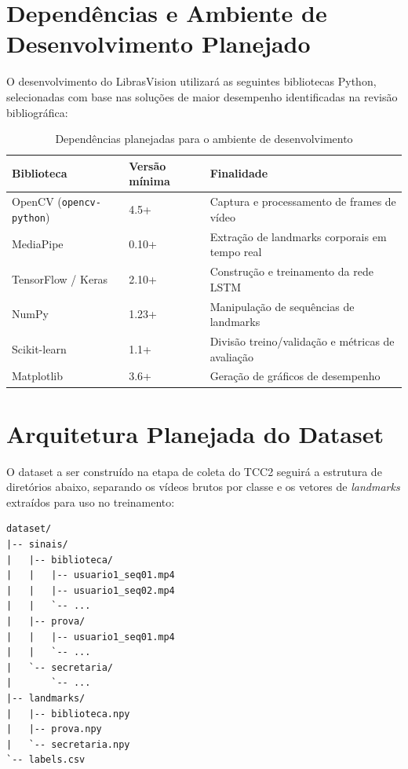 
\section{Dependências e Ambiente de Desenvolvimento Planejado}

O desenvolvimento do LibrasVision utilizará as seguintes bibliotecas Python, selecionadas com base nas soluções de maior desempenho identificadas na revisão bibliográfica:

\begin{table}[htb]
    \centering
    \caption{Dependências planejadas para o ambiente de desenvolvimento}
    \label{tab:dependencias}
    \begin{tabular}{|l|l|l|}
        \hline
        \textbf{Biblioteca} & \textbf{Versão mínima} & \textbf{Finalidade} \\
        \hline
        OpenCV (\texttt{opencv-python}) & 4.5+ & Captura e processamento de frames de vídeo \\
        MediaPipe & 0.10+ & Extração de landmarks corporais em tempo real \\
        TensorFlow / Keras & 2.10+ & Construção e treinamento da rede LSTM \\
        NumPy & 1.23+ & Manipulação de sequências de landmarks \\
        Scikit-learn & 1.1+ & Divisão treino/validação e métricas de avaliação \\
        Matplotlib & 3.6+ & Geração de gráficos de desempenho \\
        \hline
    \end{tabular}
\end{table}

\section{Arquitetura Planejada do Dataset}

O dataset a ser construído na etapa de coleta do TCC2 seguirá a estrutura de diretórios abaixo, separando os vídeos brutos por classe e os vetores de \textit{landmarks} extraídos para uso no treinamento:

\begin{verbatim}
dataset/
|-- sinais/
|   |-- biblioteca/
|   |   |-- usuario1_seq01.mp4
|   |   |-- usuario1_seq02.mp4
|   |   `-- ...
|   |-- prova/
|   |   |-- usuario1_seq01.mp4
|   |   `-- ...
|   `-- secretaria/
|       `-- ...
|-- landmarks/
|   |-- biblioteca.npy
|   |-- prova.npy
|   `-- secretaria.npy
`-- labels.csv
\end{verbatim}

